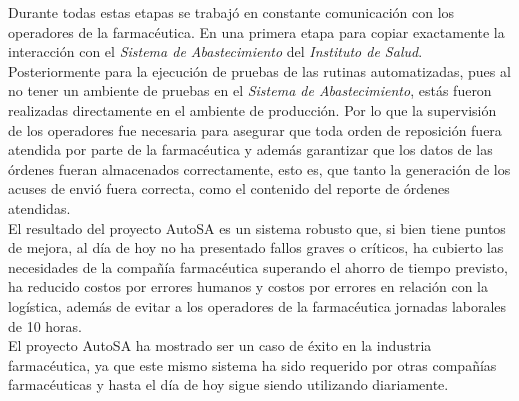 Durante todas estas etapas se trabajó en constante comunicación con los operadores de la farmacéutica. En una primera etapa para copiar exactamente la interacción con el \textit{Sistema de Abastecimiento} del \textit{Instituto de Salud}. Posteriormente para la ejecución de pruebas de las rutinas automatizadas, pues al no tener un ambiente de pruebas en el \textit{Sistema de Abastecimiento}, estás fueron realizadas directamente en el ambiente de producción. Por lo que la supervisión de los operadores fue necesaria para asegurar que toda orden de reposición fuera atendida por parte de la farmacéutica y además garantizar que los datos de las órdenes fueran almacenados correctamente, esto es, que tanto la generación de los acuses de envió fuera correcta, como el contenido del reporte de órdenes atendidas.\\
El resultado del proyecto AutoSA es un sistema robusto que, si bien tiene puntos de mejora, al día de hoy no ha presentado fallos graves o críticos, ha cubierto las necesidades de la compañía farmacéutica superando el ahorro de tiempo previsto, ha reducido costos por errores humanos y costos por errores en relación con la logística, además de evitar a los operadores de la farmacéutica jornadas laborales de 10 horas.\\
El proyecto AutoSA ha mostrado ser un caso de éxito en la industria farmacéutica, ya que este mismo sistema ha sido requerido por otras compañías farmacéuticas y hasta el día de hoy sigue siendo  utilizando diariamente.
